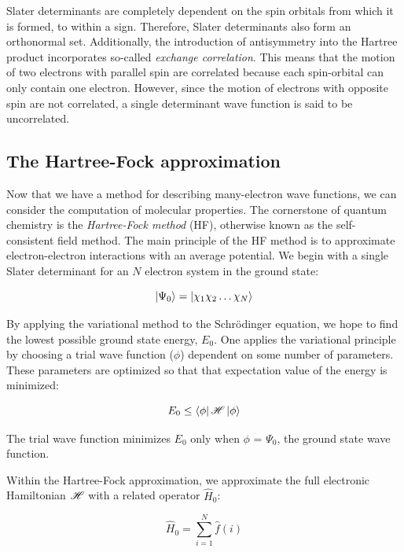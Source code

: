 \begin{doublespace}
Slater determinants are completely dependent on the spin orbitals from which it
is formed, to within a sign. Therefore, Slater determinants also form an
orthonormal set. Additionally, the introduction of antisymmetry into the Hartree
product incorporates so-called \emph{exchange correlation}. This means that the
motion of two electrons with parallel spin are correlated because each
spin-orbital can only contain one electron. However, since the motion of
electrons with opposite spin are not correlated, a single determinant wave
function is said to be uncorrelated.

\subsection{The Hartree-Fock approximation}

Now that we have a method for describing many-electron wave functions, we can
consider the computation of molecular properties. The cornerstone of quantum
chemistry is the \emph{Hartree-Fock method} (HF), otherwise known as the
self-consistent field method. The main principle of the HF method is to
approximate electron-electron interactions with an average potential. We begin
with a single Slater determinant for an $N$ electron system in the ground
state:

\begin{equation}
\ket{\Psi_0} = \ket{\chi_1\chi_2\dots\chi_N}
\end{equation}

\noindent By applying the variational method to the Schr{\"o}dinger equation,
we hope to find the lowest possible ground state energy, $E_0$. One applies the
variational principle by choosing a trial wave function ($\phi$) dependent on
some number of parameters. These parameters are optimized so that that
expectation value of the energy is minimized:

\begin{equation}
  E_0 \leq \bra{\phi}\mathscr{H}\ket{\phi}
\end{equation}

\noindent The trial wave function minimizes $E_0$ only when $\phi$ = $\Psi_0$,
the ground state wave function.

Within the Hartree-Fock approximation, we approximate the full electronic
Hamiltonian $\mathscr{H}$ with a related operator $\hat{H}_0$:

\begin{equation}
\hat{H}_0 = \sum_{i=1}^N \hat{f}(i)
\end{equation}


\end{doublespace}

